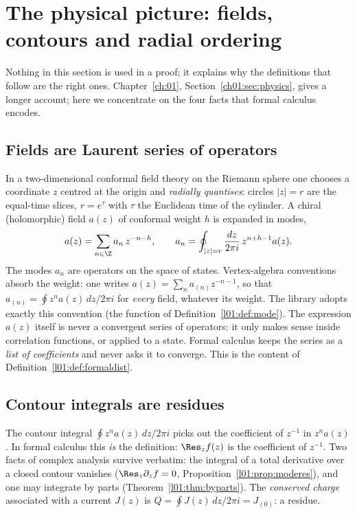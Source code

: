 \section{The physical picture: fields, contours and radial ordering}\label{l01:sec:physics}

Nothing in this section is used in a proof; it explains why the definitions that follow are the
right ones. Chapter~\ref{ch:01}, Section~\ref{ch01:sec:physics}, gives a longer account; here we
concentrate on the four facts that formal calculus encodes.

\subsection{Fields are Laurent series of operators}

In a two-dimensional conformal field theory on the Riemann sphere one chooses a coordinate $z$
centred at the origin and \emph{radially quantises}: circles $|z| = r$ are the equal-time slices,
$r = e^{\tau}$ with $\tau$ the Euclidean time of the cylinder. A chiral (holomorphic) field
$a(z)$ of conformal weight $h$ is expanded in modes,
\begin{equation*}
  a(z) = \sum_{n\in\Z} a_n\, z^{-n-h},\qquad a_n = \oint_{|z| = r}\frac{dz}{2\pi i}\,z^{n+h-1}a(z).
\end{equation*}
The modes $a_n$ are operators on the space of states. Vertex-algebra conventions absorb the
weight: one writes $a(z) = \sum_n a_{(n)} z^{-n-1}$, so that $a_{(n)} = \oint z^{n}a(z)\,dz/2\pi i$
for \emph{every} field, whatever its weight. The library adopts exactly this convention (the
function  of Definition~\ref{l01:def:mode}). The expression $a(z)$ itself is
never a convergent series of operators: it only makes sense inside correlation functions, or
applied to a state. Formal calculus keeps the series as a \emph{list of coefficients} and never
asks it to converge. This is the content of Definition~\ref{l01:def:formaldist}.

\subsection{Contour integrals are residues}

The contour integral $\oint z^{n}a(z)\,dz/2\pi i$ picks out the coefficient of $z^{-1}$ in
$z^na(z)$. In formal calculus this \emph{is} the definition: $\Res_z f(z)$ is the coefficient of
$z^{-1}$. Two facts of complex analysis survive verbatim: the integral of a total derivative over
a closed contour vanishes ($\Res_z\partial_zf = 0$, Proposition~\ref{l01:prop:moderes}), and one
may integrate by parts (Theorem~\ref{l01:thm:byparts}). The \emph{conserved charge} associated
with a current $J(z)$ is $Q = \oint J(z)\,dz/2\pi i = J_{(0)}$: a residue.

